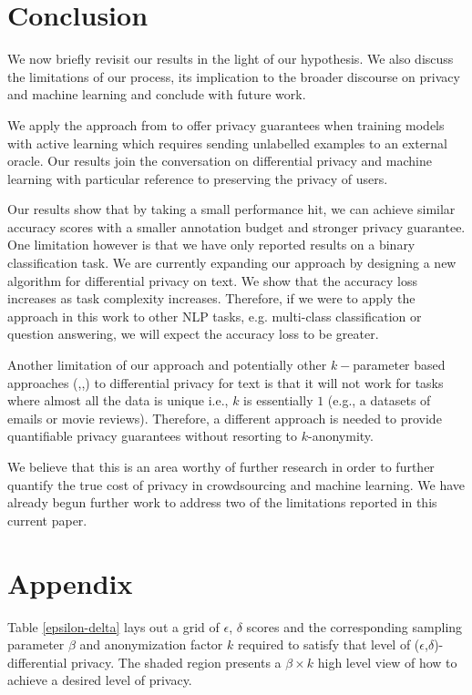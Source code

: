 \documentclass[letterpaper]{article}
\begin{document}
\section{Conclusion}
We now briefly revisit our results in the light of our hypothesis. We also discuss the limitations of our process, its implication to the broader discourse on privacy and machine learning and conclude with future work.

We apply the approach from \cite{li2012sampling} to offer privacy guarantees when training models with active learning which requires sending unlabelled examples to an external oracle. Our results join the conversation on differential privacy and machine learning \cite{ji2014differential} with particular reference to preserving the privacy of users.

Our results show that by taking a small performance hit, we can achieve similar accuracy scores with a smaller annotation budget and stronger privacy guarantee. One limitation however is that we have only reported results on a binary classification task. We are currently expanding our approach by designing a new algorithm for differential privacy on text. We show that the accuracy loss increases as task complexity increases. Therefore, if we were to apply the approach in this work to other NLP tasks, e.g. multi-class classification or question answering, we will expect the accuracy loss to be greater.

Another limitation of our approach and potentially other $k-$parameter based approaches (\cite{korolova2009releasing},\cite{gotz2012publishing},\cite{zhang2016safelog}) to differential privacy for text is that it will not work for tasks where almost all the data is unique i.e., $k$ is essentially $1$ (e.g., a datasets of emails or movie reviews). Therefore, a different approach is needed to provide quantifiable privacy guarantees without resorting to $k$-anonymity.

We believe that this is an area worthy of further research in order to further quantify the true cost of privacy in crowdsourcing and machine learning. We have already begun further work to address two of the limitations reported in this current paper.


\section{Appendix}


Table \ref{epsilon-delta} lays out a grid of $\epsilon$, $\delta$ scores and the corresponding sampling parameter $\beta$ and anonymization factor $k$ required to satisfy that level of ($\epsilon$,$\delta$)-differential privacy. The shaded region presents a $\beta \times k$ high level view of how to achieve a desired level of privacy.
\end{document}
